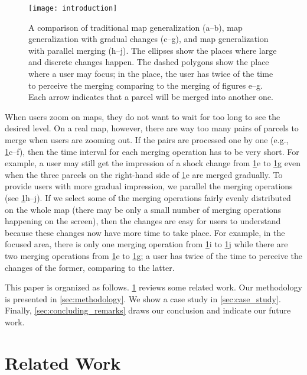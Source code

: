 \documentclass[ijgi,article,submit,moreauthors,pdftex]{Definitions/mdpi}
\begin{document}
\begin{figure}[tb]
\centering
\texttt{[image: introduction]}
\caption{A comparison of traditional map generalization (a--b),
map generalization with gradual changes (c--g),
and map generalization with parallel merging (h--j).
The ellipses show the places where large and discrete changes happen.
The dashed polygons show the place where a user may focus;
in the place, the user has twice of the time to perceive the merging
comparing to the merging of figures e--g.
Each arrow indicates that a parcel will be merged into another one. 
}
\label{fig:intro}
\end{figure}

When users zoom on maps, 
they do not want to wait for too long 
to see the desired level.
On a real map, however, 
there are way too many pairs of parcels to merge 
when users are zooming out.
If the pairs are processed one by one 
(e.g., \fig\ref{fig:intro}c--f),
then the time interval for each merging operation has to be very short.
For example, a user may still get the impression of
a shock change from \fig\ref{fig:intro}e to \fig\ref{fig:intro}g
even when the three parcels on the right-hand side of \fig\ref{fig:intro}e
are merged gradually.
To provide users with more gradual impression, 
we parallel the merging operations
(see \fig\ref{fig:intro}h--j).
If we select some of the merging operations
fairly evenly distributed on the whole map 
(there may be only a small number of merging operations 
happening on the screen),
then the changes are easy for users to understand
because these changes now have more time to take place.
For example, in the focused area, there is only one merging operation 
from \fig\ref{fig:intro}i to \fig\ref{fig:intro}j
while there are two merging operations  
from \fig\ref{fig:intro}e to \fig\ref{fig:intro}g;
a user has twice of the time to perceive the changes of the former,
comparing to the latter.

This paper is organized as follows.
\sect\ref{sec:realted_work} reviews some related work.
Our methodology is presented in \sect\ref{sec:methodology}.
We show a case study in \sect\ref{sec:case_study}.
Finally, \sect\ref{sec:concluding_remarks} draws our conclusion
and indicate our future work.





 
\section{Related Work}
\label{sec:realted_work}
\end{document}
